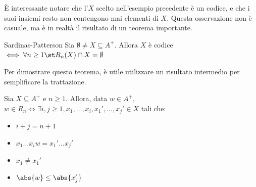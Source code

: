 È interessante notare che l'\(X\) scelto nell'esempio precedente è un codice, e che i suoi insiemi resto non contengono mai elementi di \(X\).
Questa osservazione non è casuale, ma è in realtà il risultato di un teorema importante.
\begin{theorem}[namedlabel={thm:sardinas-patterson}{Sardinas-Patterson}]{Sardinas-Patterson}
  Sia \(\emptyset \neq X \subseteq A^+\). Allora \(X\) è codice \(\iff \forall n\geq 1\st R_n(X) \cap X = \emptyset\)
\end{theorem}

Per dimostrare questo teorema, è utile utilizzare un risultato intermedio per semplificare la trattazione.

\begin{lemma}[label=lem:sardinas-patterson-intermediate]{}
  Sia \(X \subseteq A^+\) e \(n\geq 1\). Allora, data \(w \in A^+\), \(w \in R_n \iff \exists i,j\geq 1, x_1,\ldots,x_i,x_1',\ldots,x_j' \in X\) tali che:
  \begin{itemize}
    \item \(i+j=n+1\)
    \item \(x_1\ldots x_{i}w = x_1'\ldots x_j'\)
    \item \(x_1 \neq x_1'\)
    \item \(\abs{w} \leq \abs{x_j'}\)
  \end{itemize}
\end{lemma}

